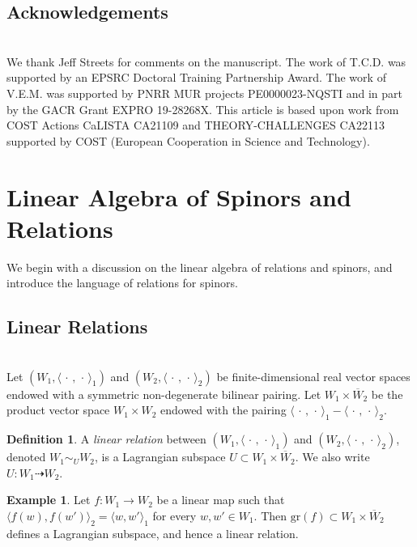 \documentclass[a4paper, reqno, 11pt]{amsart}
\numberwithin{equation}{section}
\theoremstyle{definition}
\newtheorem{definition}[equation]{Definition}
\newtheorem{example}[equation]{Example}
\newcommand{\ip}[1]{\langle #1 \rangle}
\newcommand{\gr}{\text{gr}}
\newcommand{\rel}{\dashrightarrow}
\theoremstyle{remark}
\begin{document}
\medskip

\subsection{Acknowledgements}~\\[5pt]
We thank Jeff Streets for comments on the manuscript.
The work of T.C.D. was supported by an EPSRC Doctoral Training Partnership Award. The work of V.E.M. was supported by PNRR MUR projects PE0000023-NQSTI and in part by the GACR Grant EXPRO 19-28268X. This article is based upon work from COST Actions CaLISTA CA21109 and THEORY-CHALLENGES CA22113 supported by COST (European Cooperation in Science and Technology). 

\section{Linear Algebra of Spinors and Relations} \label{sect:section2}

We begin with a discussion on the linear algebra of relations and spinors, and introduce the language of relations for spinors.

\medskip

\subsection{Linear Relations}~\\[5pt]
\label{sub:linear_relations}
Let $(W_1,\ip{\,\cdot \, ,\, \cdot \, }_1)$ and $(W_2, \ip{\, \cdot \, ,\, \cdot \,}_2)$ be finite-dimensional real vector spaces endowed with a symmetric non-degenerate bilinear pairing. Let $W_1 \times \overline{W}_2$ be the product vector space $W_1 \times W_2$ endowed with the pairing $\ip{\, \cdot \, , \, \cdot \, }_1 - \ip{\, \cdot \, , \, \cdot \,}_2$.

\begin{definition}
    A \emph{linear relation} between $(W_1,\ip{\,\cdot \, ,\, \cdot \, }_1)$ and $(W_2, \ip{\, \cdot \, ,\, \cdot \,}_2)$, denoted $W_1 \sim_U W_2$, is a Lagrangian subspace $U \subset W_1 \times \overline{W}_2$. We also write $U:W_1\rel W_2$.
\end{definition}

\begin{example}
    Let $f\colon W_1 \to W_2$ be a linear map such that $\ip{f(w),f(w')}_2 = \ip{w, w'}_1$ for every $w, w' \in W_1$. Then $\gr(f) \subset W_1 \times \overline{W}_2$ defines a Lagrangian subspace, and hence a linear relation.
\end{example}
\end{document}
